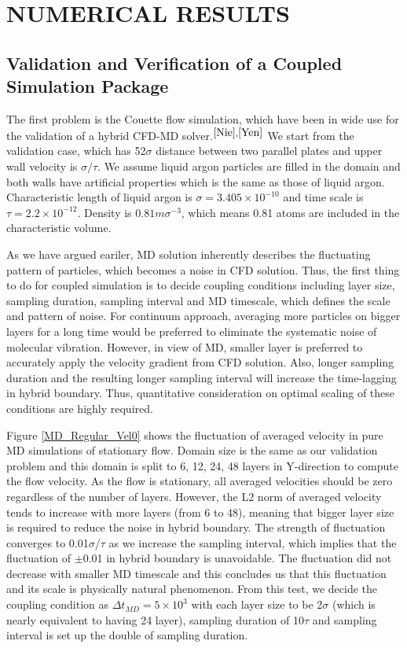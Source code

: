 \documentclass{CFD2010paper}
\begin{document}
\section{NUMERICAL RESULTS}

\subsection{Validation and Verification of a Coupled Simulation Package}
The first problem is the Couette flow simulation, which have been in wide use for the validation of a hybrid CFD-MD solver.$^{\cite{Nie},\cite{Yen}}$ We start from the validation case, which has 52$\sigma$ distance between two parallel plates and upper wall velocity is ${\sigma}/{\tau}$. We assume liquid argon particles are filled in the domain and both walls have artificial properties which is the same as those of liquid argon. Characteristic length of liquid argon is ${\sigma}=3.405{\times}10^{-10}$ and time scale is $\tau=2.2{\times}10^{-12}$. Density is $0.81m{\sigma}^{-3}$, which means 0.81 atoms are included in the characteristic volume.

As we have argued eariler, MD solution inherently describes the fluctuating pattern of particles, which becomes a noise in CFD solution. Thus, the first thing to do for coupled simulation is to decide coupling conditions including layer size, sampling duration, sampling interval and MD timescale, which defines the scale and pattern of noise. For continuum approach, averaging more particles on bigger layers for a long time would be preferred to eliminate the systematic noise of molecular vibration. However, in view of MD, smaller layer is preferred to accurately apply the velocity gradient from CFD solution. Also, longer sampling duration and the resulting longer sampling interval will increase the time-lagging in hybrid boundary. Thus, quantitative consideration on optimal scaling of these conditions are highly required.

Figure \ref{MD_Regular_Vel0} shows the fluctuation of averaged velocity in pure MD simulations of stationary flow. Domain size is the same as our validation problem and this domain is split to 6, 12, 24, 48 layers in Y-direction to compute the flow velocity. As the flow is stationary, all averaged velocities should be zero regardless of the number of layers. However, the L2 norm of averaged velocity tends to increase with more layers (from 6 to 48), meaning that bigger layer size is required to reduce the noise in hybrid boundary. The strength of fluctuation converges to 0.01$\sigma$/$\tau$ as we increase the sampling interval, which implies that the fluctuation of $\pm$0.01 in hybrid boundary is unavoidable. The fluctuation did not decrease with smaller MD timescale and this concludes us that this fluctuation and its scale is physically natural phenomenon. From this test, we decide the coupling condition as $\Delta{t_{MD}}=5\times{10^{3}}$ with each layer size to be 2$\sigma$ (which is nearly equivalent to having 24 layer), sampling duration of 10$\tau$ and sampling interval is set up the double of sampling duration.
\end{document}
